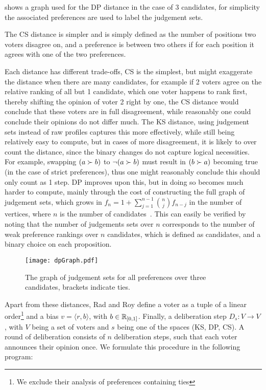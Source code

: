  shows a graph used for the DP distance in the case of
3 candidates, for simplicity the associated preferences are used to label the
judgement sets.


The CS distance is simpler and is simply defined as the number of positions two
voters disagree on, and a preference is between two others if for each position
it agrees with one of the two preferences.

Each distance has different trade-offs, CS is the simplest, but might
exaggerate the distance when there are many candidates, for example if 2
voters agree on the relative ranking of all but 1 candidate, which one voter
happens to rank first, thereby shifting the opinion of voter 2 right by one,
the CS distance would conclude that these voters are in full disagreement,
while reasonably one could conclude their opinions do not differ much. The KS
distance, using judgement sets instead of raw profiles captures this more
effectively, while still being relatively easy to compute, but in cases of more
disagreement, it is likely to over count the distance, since the binary changes
do not capture logical necessities. For example, swapping $( a \succ b)$ to
$\neg (a \succ b)$ must result in $(b \succ a)$ becoming true (in the case of
strict preferences), thus one might reasonably conclude this should only count
as 1 step. DP improves upon this, but in doing so becomes much harder to
compute, mainly through the cost of constructing the full graph of judgement
sets, which grows in $f_n = 1 + \sum_{j=1}^{n-1} \binom{n}{j} f_{n-j}$ in the
number of vertices, where $n$ is the number of candidates~\cite{grossPreferentialArrangements1962}. This can easily be
verified by noting that the number of judgements sets over $n$ corresponds to
the number of weak preference rankings over $n$ candidates, which is defined
as candidates, and a binary choice on each proposition.



\vspace{1em}
\begin{figure}[ht]
	\centering
	\texttt{[image: dpGraph.pdf]}
	\caption{The graph of judgement sets for all preferences over three candidates, brackets indicate ties.}
	\label{figure:DPDistance}
\end{figure}


Apart from these distances, Rad and Roy define a voter as a tuple of a linear
order\footnote{We exclude their analysis of preferences containing ties} and a
bias \(v = \langle r, b \rangle\), with \( b
\in \mathbb{R}_{[0,1]}\). Finally, a deliberation step \(D_{s} : V \to
V\), with $V$ being a set of voters and $s$ being one of the spaces (KS, DP,
CS). A round of deliberation consists of $n$ deliberation steps, such that each
voter announces their opinion once. We formulate this procedure in the
following program:

